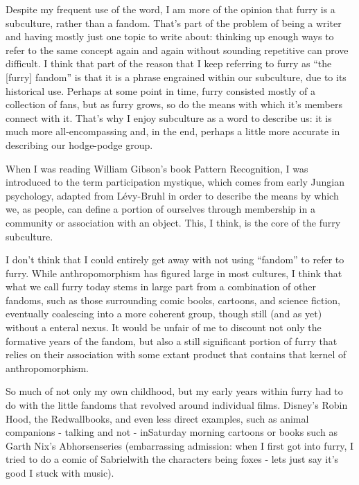 
Despite my frequent use of the word, I am more of the opinion that furry is a subculture, rather than a fandom. That's part of the problem of being a writer and having mostly just one topic to write about: thinking up enough ways to refer to the same concept again and again without sounding repetitive can prove difficult. I think that part of the reason that I keep referring to furry as ``the {[}furry{]} fandom'' is that it is a phrase engrained within our subculture, due to its historical use. Perhaps at some point in time, furry consisted mostly of a collection of fans, but as furry grows, so do the means with which it's members connect with it. That's why I enjoy subculture as a word to describe us: it is much more all-encompassing and, in the end, perhaps a little more accurate in describing our hodge-podge group.

When I was reading William Gibson's book Pattern Recognition, I was introduced to the term participation mystique, which comes from early Jungian psychology, adapted from Lévy-Bruhl in order to describe the means by which we, as people, can define a portion of ourselves through membership in a community or association with an object. This, I think, is the core of the furry subculture.

I don't think that I could entirely get away with not using ``fandom'' to refer to furry. While anthropomorphism has figured large in most cultures, I think that what we call furry today stems in large part from a combination of other fandoms, such as those surrounding comic books, cartoons, and science fiction, eventually coalescing into a more coherent group, though still (and as yet) without a enteral nexus. It would be unfair of me to discount not only the formative years of the fandom, but also a still significant portion of furry that relies on their association with some extant product that contains that kernel of anthropomorphism.

So much of not only my own childhood, but my early years within furry had to do with the little fandoms that revolved around individual films. Disney's Robin Hood, the Redwallbooks, and even less direct examples, such as animal companions - talking and not - inSaturday morning cartoons or books such as Garth Nix's Abhorsenseries (embarrassing admission: when I first got into furry, I tried to do a comic of Sabrielwith the characters being foxes - lets just say it's good I stuck with music).

